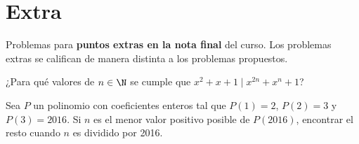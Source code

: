 \section{Extra}

Problemas para \textbf{puntos extras en la nota final} del curso.
Los problemas extras se califican de manera distinta a los problemas propuestos.

\begin{problem}
    ¿Para qué valores de $n \in \N$ se cumple que $x^2 + x + 1 \mid x^{2n} + x^n + 1$?
\end{problem}

\begin{problem}
    Sea $P$ un polinomio con coeficientes enteros tal que $P(1) = 2$, $P(2) = 3$ y $P(3) = 2016$.
    Si $n$ es el menor valor positivo posible de $P(2016)$, encontrar el resto cuando $n$ es dividido por 2016.
\end{problem}
